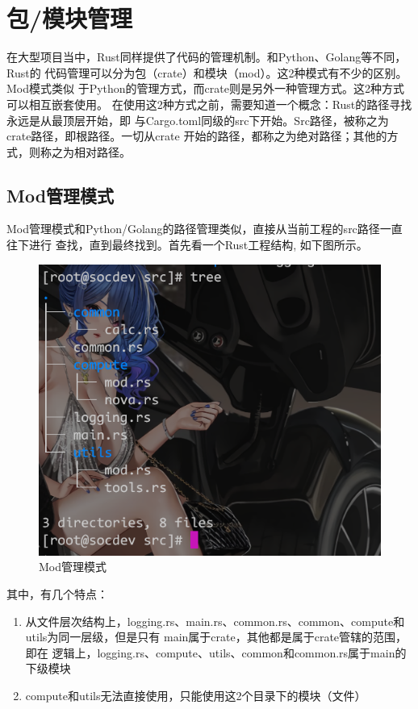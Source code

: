 \section{包/模块管理}
在大型项目当中，Rust同样提供了代码的管理机制。和Python、Golang等不同，Rust的
代码管理可以分为包（crate）和模块（mod）。这2种模式有不少的区别。Mod模式类似
于Python的管理方式，而crate则是另外一种管理方式。这2种方式可以相互嵌套使用。
在使用这2种方式之前，需要知道一个概念：Rust的路径寻找永远是从最顶层开始，即
与Cargo.toml同级的src下开始。Src路径，被称之为crate路径，即根路径。一切从crate
开始的路径，都称之为绝对路径；其他的方式，则称之为相对路径。

\subsection{Mod管理模式}
Mod管理模式和Python/Golang的路径管理类似，直接从当前工程的src路径一直往下进行
查找，直到最终找到。首先看一个Rust工程结构, 如下图所示。
\begin{figure}[H]
  \centering
  \includegraphics[scale=0.8]{rust_mod.png}
  \caption{Mod管理模式}
  \label{fig:rust_mod}
\end{figure}
其中，有几个特点：
\begin{enumerate}
  \item 从文件层次结构上，logging.rs、main.rs、common.rs、common、compute和
utils为同一层级，但是只有 main属于crate，其他都是属于crate管辖的范围，即在
逻辑上，logging.rs、compute、utils、common和common.rs属于main的下级模块
  \item compute和utils无法直接使用，只能使用这2个目录下的模块（文件）
\end{enumerate}

